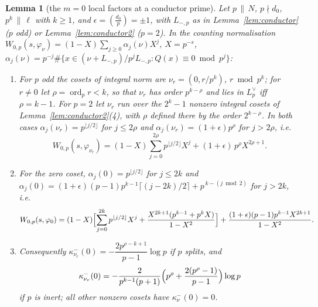 \documentclass[11pt,reqno]{amsart}
\theoremstyle{plain}
\newtheorem{lemma}[theorem]{Lemma}
\theoremstyle{definition}
\DeclareMathOperator{\ord}{ord}
\begin{document}
\begin{lemma}[the $m=0$ local factors at a conductor prime]\label{lem:Wcond}
Let $p\,\|\,N$, $p\nmid d_0$, $p^k\,\|\,\ell$ with $k\ge1$, and $\epsilon=(\tfrac{d_0}{p})=\pm1$,
with $L_{-,p}$ as in Lemma~\ref{lem:conductor} ($p$ odd) or Lemma~\ref{lem:conductor2} ($p=2$). In
the counting normalisation $W_{0,p}(s,\varphi_\nu)=(1-X)\sum_{j\ge0}
\alpha_j(\nu)X^j$, $X=p^{-s}$, $\alpha_j(\nu)=p^{-j}\#\{x\in(\nu+L_{-,p})/p^jL_{-,p}:Q(x)\equiv0
\bmod p^j\}$:
\begin{enumerate}
\item For $p$ odd the cosets of integral norm are $\nu_r=(0,r/p^k)$, $r\bmod p^k$; for
      $r\neq0$ let $\rho=\ord_p r<k$, so that $\nu_r$ has order $p^{k-\rho}$ and lies in
      $L_p^\vee$ iff $\rho=k-1$. For $p=2$ let $\nu_r$ run over the $2^k-1$ nonzero integral cosets
      of Lemma~\ref{lem:conductor2}(4), with $\rho$ defined there by the order $2^{k-\rho}$. In
      both cases $\alpha_j(\nu_r)=p^{\lfloor j/2\rfloor}$ for $j\le2\rho$ and $\alpha_j(\nu_r)=
      (1+\epsilon)p^\rho$ for $j>2\rho$, i.e.
      \[
        W_{0,p}(s,\varphi_{\nu_r})=(1-X)\sum_{j=0}^{2\rho}p^{\lfloor j/2\rfloor}X^j
                                   +(1+\epsilon)\,p^\rho X^{2\rho+1}.
      \]
\item For the zero coset, $\alpha_j(0)=p^{\lfloor j/2\rfloor}$ for $j\le2k$ and
      $\alpha_j(0)=(1+\epsilon)(p-1)p^{k-1}\lceil(j-2k)/2\rceil+p^{\,k-(j\bmod2)}$ for $j>2k$, i.e.
      \[
        W_{0,p}(s,\varphi_0)=(1-X)\Bigl[\sum_{j=0}^{2k}p^{\lfloor j/2\rfloor}X^j
          +\frac{X^{2k+1}(p^{k-1}+p^kX)}{1-X^2}\Bigr]
          +\frac{(1+\epsilon)(p-1)p^{k-1}X^{2k+1}}{1-X^2}.
      \]
\item Consequently $\kappa^-_{\nu_r}(0)=-\dfrac{2p^{\rho-k+1}}{p-1}\log p$ if $p$ splits, and
      \[
        \kappa^-_{\nu_r}(0)=-\frac{2}{p^{k-1}(p+1)}\Bigl(p^\rho+\frac{2(p^\rho-1)}{p-1}\Bigr)\log p
      \]
      if $p$ is inert; all other nonzero cosets have $\kappa^-_\nu(0)=0$.
\end{enumerate}
\end{lemma}
\end{document}
